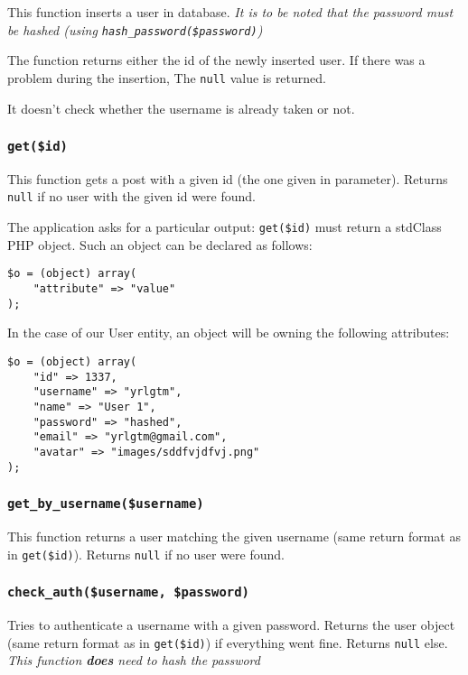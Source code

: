 \documentclass[twoside,a4paper,12pt]{article}
\begin{document}
This function inserts a user in database. \textit{It is to be noted that the password must be hashed (using \texttt{hash\_password(\$password)})}

The function returns either the id of the newly inserted user. If there was a problem during the insertion, The \texttt{null} value is returned.

It doesn't check whether the username is already taken or not.

\subsubsection{\texttt{get(\$id)}}
This function gets a post with a given id (the one given in parameter). Returns \texttt{null} if no user with the given id were found.

The application asks for a particular output: \texttt{get(\$id)} must return a stdClass PHP object. Such an object can be declared as follows:

\begin{lstlisting}
$o = (object) array(
	"attribute" => "value"
);
\end{lstlisting}

In the case of our User entity, an object will be owning the following attributes:

\begin{lstlisting}
$o = (object) array(
    "id" => 1337,
    "username" => "yrlgtm",
    "name" => "User 1",
    "password" => "hashed",
    "email" => "yrlgtm@gmail.com",
    "avatar" => "images/sddfvjdfvj.png" 
);
\end{lstlisting}

\subsubsection{\texttt{get\_by\_username(\$username)}}
This function returns a user matching the given username (same return format as in \texttt{get(\$id)}). Returns \texttt{null} if no user were found.

\subsubsection{\texttt{check\_auth(\$username, \$password)}}
Tries to authenticate a username with a given password. Returns the user object (same return format as in \texttt{get(\$id)}) if everything went fine. Returns \texttt{null} else. \textit{This function \textbf{does} need to hash the password}
\end{document}
